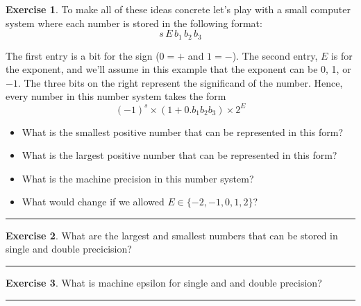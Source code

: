 \documentclass[
]{book}
\theoremstyle{definition}
\theoremstyle{definition}
\theoremstyle{definition}
\newtheorem{exercise}{Exercise}[chapter]
\theoremstyle{remark}
\begin{document}
\begin{exercise}
\protect\hypertarget{exr:unnamed-chunk-24}{}{\label{exr:unnamed-chunk-24} }To make all of these ideas concrete let's play with a small computer
system where each number is stored in the following format:
\[ s \, E \, b_1 \, b_2 \, b_3 \]

The first entry is a bit for the sign (0\(=+\) and \(1=-\)). The second
entry, \(E\) is for the exponent, and we'll assume in this example that
the exponent can be 0, 1, or \(-1\). The three bits on the right represent
the significand of the number. Hence, every number in this number system
takes the form \[(-1)^s \times (1+ 0.b_1b_2b_3) \times 2^{E}\]

\begin{itemize}
\item
  What is the smallest positive number that can be represented in this
  form?\\
\item
  What is the largest positive number that can be represented in this
  form?\\
\item
  What is the machine precision in this number system?\\
\item
  What would change if we allowed \(E \in \{-2,-1,0,1,2\}\)?
\end{itemize}
\end{exercise}

\begin{center}\rule{0.5\linewidth}{0.5pt}\end{center}

\begin{exercise}
\protect\hypertarget{exr:unnamed-chunk-25}{}{\label{exr:unnamed-chunk-25} }What are the largest and smallest numbers that can be stored in single
and double precicision?
\end{exercise}

\begin{center}\rule{0.5\linewidth}{0.5pt}\end{center}

\begin{exercise}
\protect\hypertarget{exr:unnamed-chunk-26}{}{\label{exr:unnamed-chunk-26} }What is machine epsilon for single and and double precision?
\end{exercise}

\begin{center}\rule{0.5\linewidth}{0.5pt}\end{center}
\end{document}
